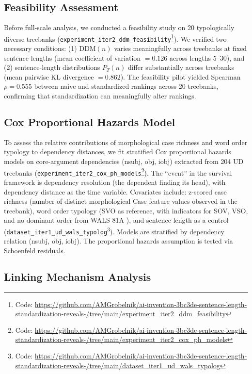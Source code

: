 \documentclass[11pt,letterpaper]{article}
\begin{document}
\subsection{Feasibility Assessment}

Before full-scale analysis, we conducted a feasibility study on 20 typologically diverse treebanks (\texttt{experiment\_iter2\_ddm\_feasibility}\footnote{Code: \url{https://github.com/AMGrobelnik/ai-invention-3bc3de-sentence-length-standardization-reveals-/tree/main/experiment_iter2_ddm_feasibility}}). We verified two necessary conditions: (1) $\text{DDM}(n)$ varies meaningfully across treebanks at fixed sentence lengths (mean coefficient of variation $= 0.126$ across lengths 5--30), and (2) sentence-length distributions $P_T(n)$ differ substantially across treebanks (mean pairwise KL divergence $= 0.862$). The feasibility pilot yielded Spearman $\rho = 0.555$ between naive and standardized rankings across 20 treebanks, confirming that standardization can meaningfully alter rankings.

\subsection{Cox Proportional Hazards Model}

To assess the relative contributions of morphological case richness and word order typology to dependency distances, we fit stratified Cox proportional hazards models on core-argument dependencies (nsubj, obj, iobj) extracted from 204 UD treebanks (\texttt{experiment\_iter2\_cox\_ph\_models}\footnote{Code: \url{https://github.com/AMGrobelnik/ai-invention-3bc3de-sentence-length-standardization-reveals-/tree/main/experiment_iter2_cox_ph_models}}). The ``event'' in the survival framework is dependency resolution (the dependent finding its head), with dependency distance as the time variable. Covariates include: z-scored case richness (number of distinct morphological Case feature values observed in the treebank), word order typology (SVO as reference, with indicators for SOV, VSO, and no dominant order from WALS 81A \citep{Dryer2013}), and sentence length as a control (\texttt{dataset\_iter1\_ud\_wals\_typolog}\footnote{Code: \url{https://github.com/AMGrobelnik/ai-invention-3bc3de-sentence-length-standardization-reveals-/tree/main/dataset_iter1_ud_wals_typolog}}). Models are stratified by dependency relation (nsubj, obj, iobj). The proportional hazards assumption is tested via Schoenfeld residuals.

\subsection{Linking Mechanism Analysis}
\end{document}
